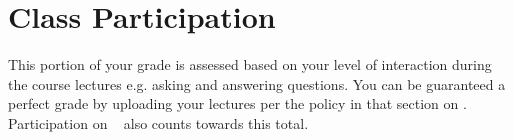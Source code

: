 \section*{Class Participation}

This portion of your grade is assessed based on your level of interaction during the course lectures e.g. asking and answering questions. You can be guaranteed a perfect grade by uploading your lectures per the policy in that section on \pageref{subsec:lecture_upload}. Participation on \slacklink~ also counts towards this total.